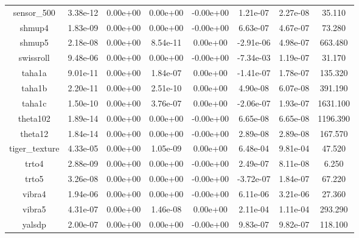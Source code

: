 {{\begin{table}[h]
\begin{center}
{\begin{tabular}{cccccccc}
          sensor\_500 & 3.38e-12 & 0.00e+00 & 0.00e+00 & -0.00e+00 & 1.21e-07 & 2.27e-08 & 35.110 \\ 
              shmup4 & 1.83e-09 & 0.00e+00 & 0.00e+00 & -0.00e+00 & 6.63e-07 & 4.67e-07 & 73.280 \\ 
              shmup5 & 2.18e-08 & 0.00e+00 & 8.54e-11 & 0.00e+00 & -2.91e-06 & 4.98e-07 & 663.480 \\ 
           swissroll & 9.48e-06 & 0.00e+00 & 0.00e+00 & -0.00e+00 & -7.34e-03 & 1.19e-07 & 31.170 \\ 
              taha1a & 9.01e-11 & 0.00e+00 & 1.84e-07 & 0.00e+00 & -1.41e-07 & 1.78e-07 & 135.320 \\ 
              taha1b & 2.20e-11 & 0.00e+00 & 2.51e-10 & 0.00e+00 & 4.90e-08 & 6.07e-08 & 391.190 \\ 
              taha1c & 1.50e-10 & 0.00e+00 & 3.76e-07 & 0.00e+00 & -2.06e-07 & 1.93e-07 & 1631.100 \\ 
            theta102 & 1.89e-14 & 0.00e+00 & 0.00e+00 & -0.00e+00 & 6.65e-08 & 6.65e-08 & 1196.390 \\ 
             theta12 & 1.84e-14 & 0.00e+00 & 0.00e+00 & -0.00e+00 & 2.89e-08 & 2.89e-08 & 167.570 \\ 
       tiger\_texture & 4.33e-05 & 0.00e+00 & 1.05e-09 & 0.00e+00 & 6.48e-04 & 9.81e-04 & 47.520 \\ 
               trto4 & 2.88e-09 & 0.00e+00 & 0.00e+00 & -0.00e+00 & 2.49e-07 & 8.11e-08 & 6.250 \\ 
               trto5 & 3.26e-08 & 0.00e+00 & 0.00e+00 & -0.00e+00 & -3.72e-07 & 1.84e-07 & 67.220 \\ 
              vibra4 & 1.94e-06 & 0.00e+00 & 0.00e+00 & -0.00e+00 & 6.11e-06 & 3.21e-06 & 27.360 \\ 
              vibra5 & 4.31e-07 & 0.00e+00 & 1.46e-08 & 0.00e+00 & 2.11e-04 & 1.11e-04 & 293.290 \\ 
              yalsdp & 2.00e-07 & 0.00e+00 & 0.00e+00 & -0.00e+00 & 9.83e-07 & 9.82e-07 & 118.100 \\ 

      \bottomrule
    \end{tabular}
  }  
\end{center}  
\end{table}}}


